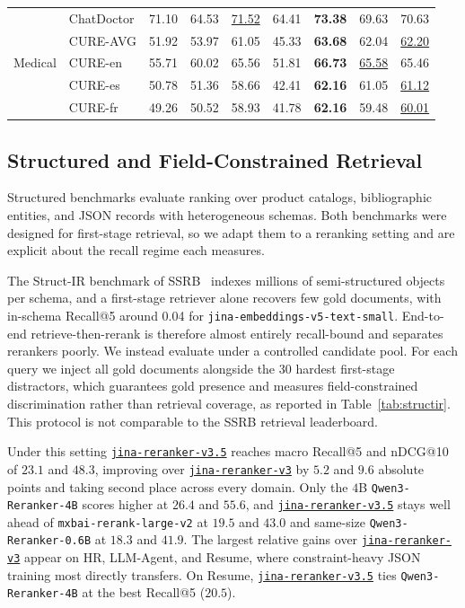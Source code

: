\documentclass{article}
\newcommand{\jrrvthree}{\href{https://huggingface.co/jinaai/jina-reranker-v3}{\texttt{jina-reranker-v3}}}
\newcommand{\jrrvthreefive}{\href{https://huggingface.co/jinaai/jina-reranker-v3.5}{\texttt{jina-reranker-v3.5}}}
\newcommand{\qwenrerankersmall}{\texttt{Qwen3-Reranker-0.6B}}
\newcommand{\qwenrankerlarge}{\texttt{Qwen3-Reranker-4B}}
\newcommand{\jinaembedsmall}{\texttt{jina-embeddings-v5-text-small}}
\newcommand{\mxbailarge}{\texttt{mxbai-rerank-large-v2}}
\begin{document}
\begin{table}[t]
{\begin{tabular}{llccccccc}
\midrule
\multirow{5}{*}{Medical} & ChatDoctor & 71.10 & 64.53 & \underline{71.52} & 64.41 & \textbf{73.38} & 69.63 & 70.63 \\
 & CURE-AVG & 51.92 & 53.97 & 61.05 & 45.33 & \textbf{63.68} & 62.04 & \underline{62.20} \\
 & CURE-en & 55.71 & 60.02 & 65.56 & 51.81 & \textbf{66.73} & \underline{65.58} & 65.46 \\
 & CURE-es & 50.78 & 51.36 & 58.66 & 42.41 & \textbf{62.16} & 61.05 & \underline{61.12} \\
 & CURE-fr & 49.26 & 50.52 & 58.93 & 41.78 & \textbf{62.16} & 59.48 & \underline{60.01} \\
\bottomrule
\end{tabular}%
}
\end{table}


\subsection{Structured and Field-Constrained Retrieval}
\label{sec:structured}

Structured benchmarks evaluate ranking over product catalogs, bibliographic entities,
and JSON records with heterogeneous schemas. Both benchmarks were designed for
first-stage retrieval, so we adapt them to a reranking setting and are explicit about
the recall regime each measures.

The Struct-IR benchmark of SSRB~\citep{ssrb} indexes millions of semi-structured objects per schema, and a
first-stage retriever alone recovers few gold documents, with in-schema Recall@5 around 0.04 for \jinaembedsmall{}.
End-to-end retrieve-then-rerank is therefore almost entirely recall-bound and separates rerankers poorly.
We instead evaluate under a controlled candidate pool. For each query we inject all gold documents
alongside the 30 hardest first-stage distractors, which guarantees gold presence and measures
field-constrained discrimination rather than retrieval coverage, as reported in Table~\ref{tab:structir}.
This protocol is not comparable to the SSRB retrieval leaderboard.

Under this setting \jrrvthreefive{} reaches macro Recall@5 and nDCG@10 of $23.1$ and $48.3$,
improving over \jrrvthree{} by $5.2$ and $9.6$ absolute points and taking second place across every domain.
Only the $4$B \qwenrankerlarge{} scores higher at $26.4$ and $55.6$, and \jrrvthreefive{} stays well ahead of \mxbailarge{} at $19.5$ and $43.0$
and same-size \qwenrerankersmall{} at $18.3$ and $41.9$.
The largest relative gains over \jrrvthree{} appear on HR, LLM-Agent, and Resume, where constraint-heavy
JSON training most directly transfers.
On Resume, \jrrvthreefive{} ties \qwenrankerlarge{} at the best Recall@5 ($20.5$).
\end{document}
